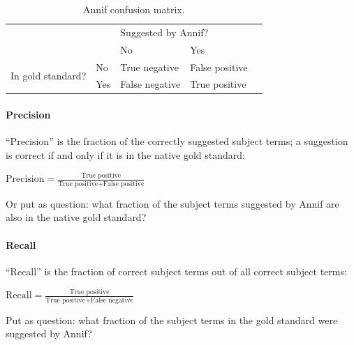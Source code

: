 \begin{table}[h]
\centering
\begin{tabular}{lllll}
 &                       & \multicolumn{2}{l}{Suggested by Annif?}            &  \\ \cline{3-4}
 & \multicolumn{1}{l|}{} & \multicolumn{1}{l|}{No} & \multicolumn{1}{l|}{Yes} &  \\ \cline{2-4}
\multicolumn{1}{l|}{\multirow{2}{*}{In gold standard?}} & \multicolumn{1}{l|}{No}  & \multicolumn{1}{l|}{True negative}  & \multicolumn{1}{l|}{False positive} &  \\ \cline{2-4}
\multicolumn{1}{l|}{}                                   & \multicolumn{1}{l|}{Yes} & \multicolumn{1}{l|}{False negative} & \multicolumn{1}{l|}{True positive}  &  \\ \cline{2-4}
\end{tabular}
\caption{Annif confusion matrix.}
\label{tab:confusion-matrix}
\end{table}

\hypertarget{precision}{%
\paragraph{Precision}\label{precision}}

``Precision'' is the fraction of the correctly suggested subject terms;
a suggestion is correct if and only if it is in the native gold
standard:

\begin{center} 
$\text{Precision} = \displaystyle \frac{\text{True positive}}{\text{True positive} + \text{False positive}}$
\end{center}

Or put as question: what fraction of the subject terms suggested by
Annif are also in the native gold standard?

\hypertarget{recall}{%
\paragraph{Recall}\label{recall}}

``Recall'' is the fraction of correct subject terms out of all correct
subject terms:

\begin{center} 
$\text{Recall} = \displaystyle \frac{\text{True positive}}{\text{True positive} + \text{False negative}}$
\end{center}

Put as question: what fraction of the subject terms in the gold standard
were suggested by Annif?

